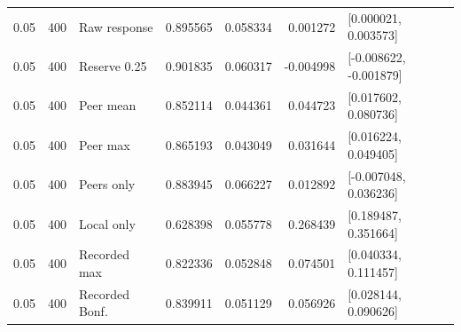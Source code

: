 {\begin{longtable}{rrlrrrrl}
0.05 & 400 & Raw response & 0.895565 & 0.058334 & 0.001272 & \multicolumn{2}{l}{[0.000021, 0.003573]}\\
0.05 & 400 & Reserve 0.25 & 0.901835 & 0.060317 & -0.004998 & \multicolumn{2}{l}{[-0.008622, -0.001879]}\\
0.05 & 400 & Peer mean & 0.852114 & 0.044361 & 0.044723 & \multicolumn{2}{l}{[0.017602, 0.080736]}\\
0.05 & 400 & Peer max & 0.865193 & 0.043049 & 0.031644 & \multicolumn{2}{l}{[0.016224, 0.049405]}\\
0.05 & 400 & Peers only & 0.883945 & 0.066227 & 0.012892 & \multicolumn{2}{l}{[-0.007048, 0.036236]}\\
0.05 & 400 & Local only & 0.628398 & 0.055778 & 0.268439 & \multicolumn{2}{l}{[0.189487, 0.351664]}\\
0.05 & 400 & Recorded max & 0.822336 & 0.052848 & 0.074501 & \multicolumn{2}{l}{[0.040334, 0.111457]}\\
0.05 & 400 & Recorded Bonf. & 0.839911 & 0.051129 & 0.056926 & \multicolumn{2}{l}{[0.028144, 0.090626]}\\
\midrule
\end{longtable}}
